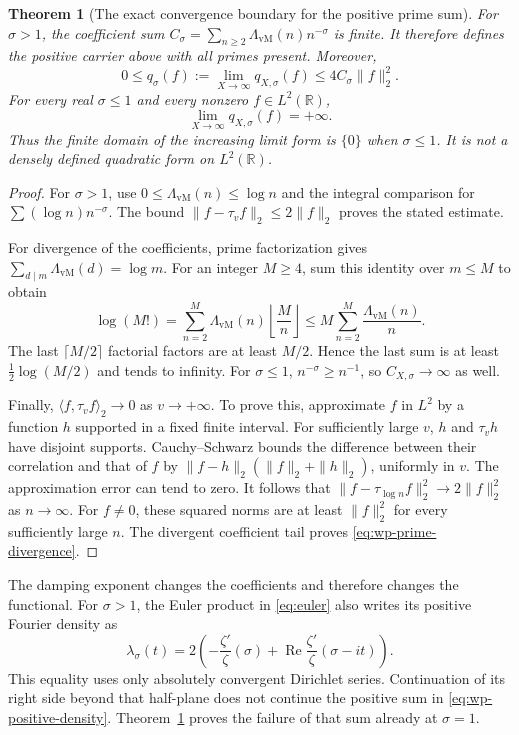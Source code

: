 \documentclass[11pt]{article}
\newtheorem{theorem}{Theorem}[section]
\theoremstyle{definition}
\theoremstyle{remark}
\numberwithin{equation}{section}
\newcommand{\R}{\mathbb R}
\begin{document}
\begin{theorem}[The exact convergence boundary for the positive prime sum]
\label{thm:wp-prime-limit}
For $\sigma>1$, the coefficient sum
$C_\sigma=\sum_{n\geq2}\Lambda_{\mathrm{vM}}(n)n^{-\sigma}$ is finite.
It therefore defines the positive carrier above with all primes present.
Moreover,
\[
 0\leq q_\sigma(f):=\lim_{X\to\infty}q_{X,\sigma}(f)
 \leq4C_\sigma\|f\|_2^2.
\]
For every real $\sigma\leq1$ and every nonzero $f\in L^2(\R)$,
\begin{equation}
 \lim_{X\to\infty}q_{X,\sigma}(f)=+\infty.
 \label{eq:wp-prime-divergence}
\end{equation}
Thus the finite domain of the increasing limit form is $\{0\}$
when $\sigma\leq1$.
It is not a densely defined quadratic form on $L^2(\R)$.
\end{theorem}
\begin{proof}
For $\sigma>1$, use
$0\leq\Lambda_{\mathrm{vM}}(n)\leq\log n$ and the integral comparison
for $\sum(\log n)n^{-\sigma}$.
The bound $\|f-\tau_v f\|_2\leq2\|f\|_2$ proves the stated estimate.

For divergence of the coefficients, prime factorization gives
$\sum_{d\mid m}\Lambda_{\mathrm{vM}}(d)=\log m$.
For an integer $M\geq4$, sum this identity over $m\leq M$ to obtain
\[
 \log(M!)=\sum_{n=2}^M\Lambda_{\mathrm{vM}}(n)
                          \left\lfloor\frac Mn\right\rfloor
 \leq M\sum_{n=2}^M\frac{\Lambda_{\mathrm{vM}}(n)}n.
\]
The last $\lceil M/2\rceil$ factorial factors are at least $M/2$.
Hence the last sum is at least $\frac12\log(M/2)$ and tends to infinity.
For $\sigma\leq1$, $n^{-\sigma}\geq n^{-1}$, so
$C_{X,\sigma}\to\infty$ as well.

Finally, $\langle f,\tau_v f\rangle_2\to0$ as $v\to+\infty$.
To prove this, approximate $f$ in $L^2$ by a function $h$ supported
in a fixed finite interval.
For sufficiently large $v$, $h$ and $\tau_vh$ have disjoint supports.
Cauchy--Schwarz bounds the difference between their correlation and
that of $f$ by $\|f-h\|_2(\|f\|_2+\|h\|_2)$, uniformly in $v$.
The approximation error can tend to zero.
It follows that
$\|f-\tau_{\log n}f\|_2^2\to2\|f\|_2^2$ as $n\to\infty$.
For $f\ne0$, these squared norms are at least $\|f\|_2^2$
for every sufficiently large $n$.
The divergent coefficient tail proves \eqref{eq:wp-prime-divergence}.
\end{proof}

The damping exponent changes the coefficients and therefore changes the
functional.
For $\sigma>1$, the Euler product in \eqref{eq:euler} also writes its
positive Fourier density as
\[
 \lambda_\sigma(t)=2\left(-\frac{\zeta'}{\zeta}(\sigma)
       +\operatorname{Re}\frac{\zeta'}{\zeta}(\sigma-it)\right).
\]
This equality uses only absolutely convergent Dirichlet series.
Continuation of its right side beyond that half-plane does not continue
the positive sum in \eqref{eq:wp-positive-density}.
Theorem~\ref{thm:wp-prime-limit} proves the failure of that sum already
at $\sigma=1$.
\end{document}
